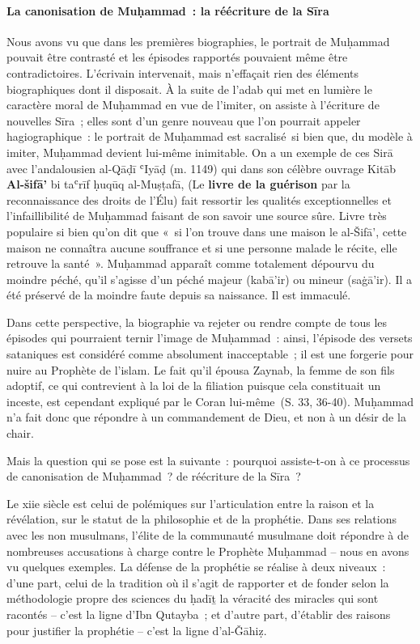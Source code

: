 \paragraph{La canonisation de Muḥammad~: la
réécriture de la Sīra
}

Nous avons vu que dans les premières biographies, le portrait de
Muḥammad pouvait être contrasté et les épisodes rapportés pouvaient même
être contradictoires. L'écrivain intervenait, mais n'effaçait rien des
éléments biographiques dont il disposait. À la suite de l'adab qui met
en lumière le caractère moral de Muḥammad en vue de l'imiter, on assiste
à l'écriture de nouvelles Sīra~; elles sont d'un genre nouveau que l'on
pourrait appeler hagiographique~: le portrait de Muḥammad est
sacralisé~si bien que, du modèle à imiter, Muḥammad devient lui-même
inimitable. On a un exemple de ces Sirā avec l'andalousien al-Qāḍī ʿIyāḍ
(m. 1149) qui dans son célèbre ouvrage Kitāb \textbf{Al-šifā'} bi taʿrīf
ḥuqūq al-Muṣṭafā, (Le \textbf{livre de la guérison} par la
reconnaissance des droits de l'Élu) fait ressortir les qualités
exceptionnelles et l'infaillibilité de Muḥammad faisant de son savoir
une source sûre. Livre très populaire si bien qu'on dit que «~si l'on
trouve dans une maison le al-Šifā', cette maison ne connaîtra aucune
souffrance et si une personne malade le récite, elle retrouve la
santé~». Muḥammad apparaît comme totalement dépourvu du moindre péché,
qu'il s'agisse d'un péché majeur (kabā'ir) ou mineur (saġā'ir). Il a été
préservé de la moindre faute depuis sa naissance. Il est immaculé.

Dans cette perspective, la biographie va rejeter ou rendre compte de
tous les épisodes qui pourraient ternir l'image de Muḥammad~: ainsi,
l'épisode des versets sataniques est considéré comme absolument
inacceptable~; il est une forgerie pour nuire au Prophète de l'islam. Le
fait qu'il épousa Zaynab, la femme de son fils adoptif, ce qui
contrevient à la loi de la filiation puisque cela constituait un
inceste, est cependant expliqué par le Coran lui-même~(S. 33, 36-40).
Muḥammad n'a fait donc que répondre à un commandement de Dieu, et non à
un désir de la chair.

Mais la question qui se pose est la suivante~: pourquoi assiste-t-on à
ce processus de canonisation de Muḥammad~? de réécriture de la Sīra~?

Le xiie siècle est celui de polémiques sur l'articulation entre la
raison et la révélation, sur le statut de la philosophie et de la
prophétie. Dans ses relations avec les non musulmans, l'élite de la
communauté musulmane doit répondre à de nombreuses accusations à charge
contre le Prophète Muḥammad -- nous en avons vu quelques exemples. La
défense de la prophétie se réalise à deux niveaux~: d'une part, celui de
la tradition où il s'agit de rapporter et de fonder selon la
méthodologie propre des sciences du ḥadīṯ la véracité des miracles qui
sont racontés -- c'est la ligne d'Ibn Qutayba~; et d'autre part,
d'établir des raisons pour justifier la prophétie -- c'est la ligne
d'al-Ǧāhiẓ.

